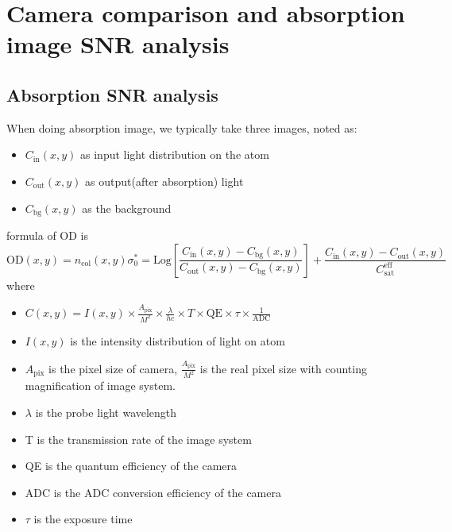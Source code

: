 \chapter{Camera comparison and absorption image SNR analysis}

\section{Absorption SNR analysis}

When doing absorption image, we typically take three images, noted as:
\begin{itemize}[noitemsep,topsep=0pt]
    \item \(C_{\text{in}}(x,y)\) as input light distribution on the atom
    \item \(C_{\text{out}}(x,y)\) as output(after absorption) light
    \item \(C_{\text{bg}}(x,y)\) as the background
\end{itemize}
formula of OD is
\begin{equation}
\text{OD}(x,y)=n_{\text{col}}(x,y)\sigma _0^*=\text{Log}\left[\frac{C_{\text{in}}(x,y)-C_{\text{bg}}(x,y)}{C_{\text{out}}(x,y)-C_{\text{bg}}(x,y)}\right]+\frac{C_{\text{in}}(x,y)-C_{\text{out}}(x,y)}{C_{\text{sat}}^{\text{eff}}}
\end{equation}
where
\begin{itemize}[noitemsep,topsep=0pt]
    \item \(C(x,y)=I(x,y)\times \frac{A_{\text{pix}}}{M^2}\times \frac{\lambda }{h c}\times T\times \text{QE}\times \tau \times \frac{1}{\text{ADC}}\)
    \item \(I(x,y)\) is the intensity distribution of light on atom
    \item \(A_{\text{pix}}\) is the pixel size of camera, \(\frac{A_{\text{pix}}}{M^2}\) is the real pixel size with counting magnification of image system.
    \item $\lambda $ is the probe light wavelength
    \item T is the transmission rate of the image system
    \item QE is the quantum efficiency of the camera
    \item ADC is the ADC conversion efficiency of the camera
    \item $\tau $ is the exposure time
\end{itemize}


